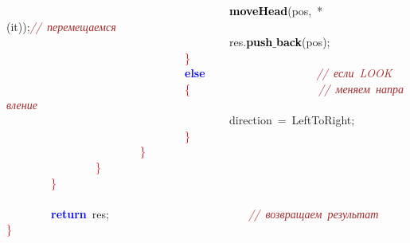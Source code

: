 \mbox{}\ \ \ \ \ \ \ \ \ \ \ \ \ \ \ \ \ \ \ \ \ \ \ \ \ \ \ \ \ \ \ \ \ \ \ \ \ \ \ \ \textbf{\textcolor{Black}{moveHead}}\textcolor{BrickRed}{(}pos\textcolor{BrickRed}{,}\ \textcolor{BrickRed}{*(}it\textcolor{BrickRed}{));}\textit{\textcolor{Brown}{//\ перемещаемся}} \\
\mbox{}\ \ \ \ \ \ \ \ \ \ \ \ \ \ \ \ \ \ \ \ \ \ \ \ \ \ \ \ \ \ \ \ \ \ \ \ \ \ \ \ res\textcolor{BrickRed}{.}\textbf{\textcolor{Black}{push$\_$back}}\textcolor{BrickRed}{(}pos\textcolor{BrickRed}{);} \\
\mbox{}\ \ \ \ \ \ \ \ \ \ \ \ \ \ \ \ \ \ \ \ \ \ \ \ \ \ \ \ \ \ \ \ \textcolor{Red}{\}} \\
\mbox{}\ \ \ \ \ \ \ \ \ \ \ \ \ \ \ \ \ \ \ \ \ \ \ \ \ \ \ \ \ \ \ \ \textbf{\textcolor{Blue}{else}}\ \ \ \ \ \ \ \ \ \ \ \ \ \ \ \ \ \ \ \ \textit{\textcolor{Brown}{//\ если\ LOOK}} \\
\mbox{}\ \ \ \ \ \ \ \ \ \ \ \ \ \ \ \ \ \ \ \ \ \ \ \ \ \ \ \ \ \ \ \ \textcolor{Red}{\{}\ \ \ \ \ \ \ \ \ \ \ \ \ \ \ \ \ \ \ \ \ \ \ \textit{\textcolor{Brown}{//\ меняем\ направление}} \\
\mbox{}\ \ \ \ \ \ \ \ \ \ \ \ \ \ \ \ \ \ \ \ \ \ \ \ \ \ \ \ \ \ \ \ \ \ \ \ \ \ \ \ direction\ \textcolor{BrickRed}{=}\ LeftToRight\textcolor{BrickRed}{;} \\
\mbox{}\ \ \ \ \ \ \ \ \ \ \ \ \ \ \ \ \ \ \ \ \ \ \ \ \ \ \ \ \ \ \ \ \textcolor{Red}{\}} \\
\mbox{}\ \ \ \ \ \ \ \ \ \ \ \ \ \ \ \ \ \ \ \ \ \ \ \ \textcolor{Red}{\}} \\
\mbox{}\ \ \ \ \ \ \ \ \ \ \ \ \ \ \ \ \textcolor{Red}{\}} \\
\mbox{}\ \ \ \ \ \ \ \ \textcolor{Red}{\}} \\
\mbox{} \\
\mbox{}\ \ \ \ \ \ \ \ \textbf{\textcolor{Blue}{return}}\ res\textcolor{BrickRed}{;}\ \ \ \ \ \ \ \ \ \ \ \ \ \ \ \ \ \ \ \ \ \ \ \ \ \textit{\textcolor{Brown}{//\ возвращаем\ результат}} \\
\mbox{}\textcolor{Red}{\}} \\
\mbox{}
